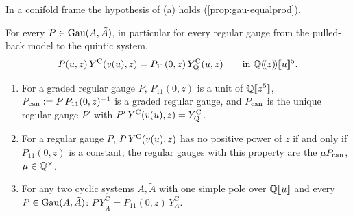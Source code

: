 In a conifold frame the hypothesis of (a) holds (\cref{prop:gau-equalprod}).

\begin{thm}
\label{thm:gau-G}
For every $P\in\operatorname{Gau}(A,\tilde A)$, in particular for every regular gauge from the pulled-back model to the quintic system,
\begin{equation}
\label{eq:gau-G}
P(u,z)\,Y^{\mathrm{C}}(v(u),z)=P_{11}(0,z)\,Y^{\mathrm{C}}_{\mathrm{Q}}(u,z)\qquad\text{in }\mathbb{Q}(\!(z)\!)[\![ u ]\!]^5 .
\end{equation}
\begin{enumerate}
\item[(a)] For a graded regular gauge $P$, $P_{11}(0,z)$ is a unit of $\mathbb{Q}[\![ z^5 ]\!]$, $P_{\mathrm{can}}:=P\,P_{11}(0,z)^{-1}$ is a graded regular gauge, and $P_{\mathrm{can}}$ is the unique regular gauge $P'$ with $P'\,Y^{\mathrm{C}}(v(u),z)=Y^{\mathrm{C}}_{\mathrm{Q}}$.
\item[(b)] For a regular gauge $P$, $P\,Y^{\mathrm{C}}(v(u),z)$ has no positive power of $z$ if and only if $P_{11}(0,z)$ is a constant; the regular gauges with this property are the $\mu P_{\mathrm{can}}$, $\mu\in\mathbb{Q}^\times$.
\item[(c)] For any two cyclic systems $A,\tilde A$ with one simple pole over $\mathbb{Q}[\![ u ]\!]$ and every $P\in\operatorname{Gau}(A,\tilde A)$: $P\,Y^{\mathrm C}_{\tilde A}=P_{11}(0,z)\,Y^{\mathrm C}_A$.
\end{enumerate}
\end{thm}

